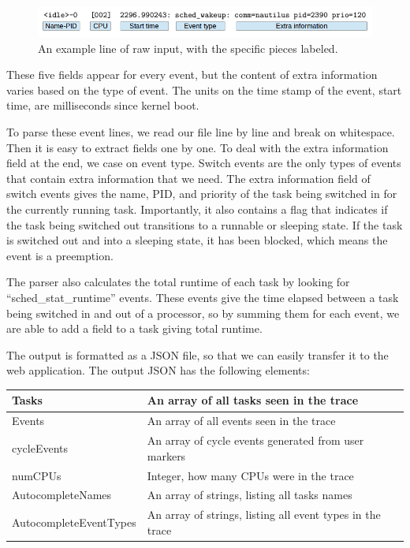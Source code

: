 \documentclass{hmcclinic}
\begin{document}
  \begin{figure}
  \includegraphics[scale=0.4]{parserExample.png}
  \caption{An example line of raw input, with the specific pieces labeled.}
  \end{figure}

  These five fields appear for every event, but the content of extra information
  varies based on the type of event. The units on the time stamp of the event,
  start time, are milliseconds since kernel boot.

  To parse these event lines, we read our file line by line and break on
  whitespace. Then it is easy to extract fields one by one. To deal with the
  extra information field at the end, we case on event type. Switch events
  are the only types of events that contain extra information that we need.  The
  extra information field of switch events gives the name, PID, and priority of
  the task being switched in for the currently running task. Importantly, it
  also contains a flag that indicates if the task being switched out transitions
  to a runnable or sleeping state. If the task is switched out and into a
  sleeping state, it has been blocked, which means the event is a preemption.

  The parser also calculates the total runtime of each task by looking for
  ``sched\_stat\_runtime'' events. These events give the time elapsed between
  a task being switched in and out of a processor, so by summing them for 
  each event, we are able to add a field to a task giving total runtime.

  The output is formatted as a JSON file, so that we can easily transfer it to
  the web application. The output JSON has the following elements:

  \begin{center}
    \begin{tabular}{|l|l|}
      \hline
      Tasks      & An array of all tasks seen in the trace\\
      \hline
      Events     & An array of all events seen in the trace\\
      \hline
      cycleEvents & An array of cycle events generated from user markers\\
      \hline
      numCPUs     & Integer, how many CPUs were in the trace\\
      \hline
      AutocompleteNames & An array of strings, listing all tasks names\\
      \hline
      AutocompleteEventTypes & An array of strings, listing all event types in
      the trace\\
      \hline
    \end{tabular}
  \end{center}
\end{document}
